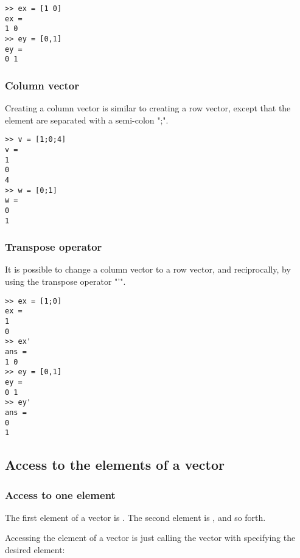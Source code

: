 \begin{lstlisting}
>> ex = [1 0]
ex =
1 0
>> ey = [0,1]
ey =
0 1
\end{lstlisting}
 


\subsubsection{Column vector}
Creating a column vector is similar to creating a row vector, except that the element are separated with a semi-colon ";".


\begin{lstlisting}
>> v = [1;0;4]
v =
1
0
4
>> w = [0;1]
w =
0
1
\end{lstlisting}

\subsubsection{Transpose operator}

It is possible to change a column vector to a row vector, and reciprocally, by using the transpose operator "'".
\begin{lstlisting}
>> ex = [1;0]
ex =
1
0
>> ex'
ans =
1 0
>> ey = [0,1]
ey =
0 1
>> ey'
ans =
0
1
\end{lstlisting}


\subsection{Access to the elements of a vector}

\subsubsection{Access to one element}

The first element of a vector  is .
The second element is , and so forth.

Accessing the element of a vector is just calling the vector with specifying the desired element:

